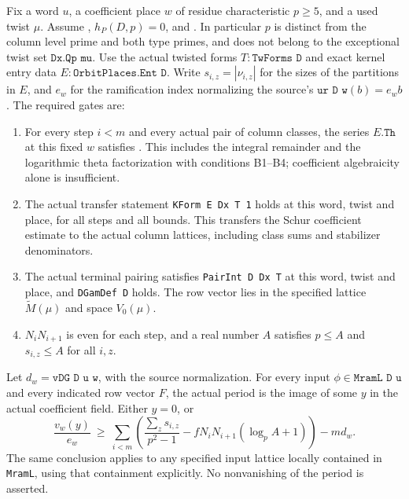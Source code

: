 \documentclass[11pt,a4paper]{article}
\theoremstyle{definition}
\theoremstyle{remark}
\begin{document}
Fix a word $u$, a coefficient place $w$ of residue characteristic
$p\ge5$, and a used twist $\mu$.  Assume
, $h_P(D,p)=0$, and
.  In particular $p$ is distinct from the
column level prime and both type primes, and does not belong to the
exceptional twist set $\texttt{Dx.Qp mu}$.
Use the actual twisted forms $T:\texttt{TwForms D}$ and exact kernel
entry data $E:\texttt{OrbitPlaces.Ent D}$.  Write
$s_{i,z}=|\nu_{i,z}|$ for the sizes of the partitions in $E$, and
$e_w$ for the ramification index normalizing the source's
$\texttt{ur D w}(b)=e_wb$.  The required gates are:
\begin{enumerate}
\item For every step $i<m$ and every actual pair of column classes,
      the series $E.\texttt{Th}$ at this fixed $w$ satisfies
      .  This includes the integral
      remainder and the logarithmic theta factorization with conditions
      B1--B4; coefficient algebraicity alone is insufficient.
\item The actual transfer statement \texttt{KForm E Dx T 1} holds at
      this word, twist and place, for all steps and all bounds.  This
      transfers the Schur coefficient estimate to the actual column
      lattices, including class sums and stabilizer denominators.
\item The actual terminal pairing satisfies \texttt{PairInt D Dx T}
      at this word, twist and place, and \texttt{DGamDef D} holds.
      The row vector lies in the specified lattice
      $\widetilde M(\mu)$ and space $V_0(\mu)$.
\item $N_iN_{i+1}$ is even for each step, and a real number $A$ satisfies
      $p\le A$ and $s_{i,z}\le A$ for all $i,z$.
\end{enumerate}
Let $d_w=\texttt{vDG D u w}$, with the source normalization.
For every input $\phi\in\texttt{MramL D u}$ and every indicated row
vector $F$, the actual period is the image of some $y$ in the actual
coefficient field.  Either $y=0$, or
\begin{equation}\label{eq:SF08-pointwise}
 \frac{v_w(y)}{e_w}\ \ge\
 \sum_{i<m}\left(
   \frac{\sum_z s_{i,z}}{p^2-1}
       -fN_iN_{i+1}(\log_p A+1)\right)-m d_w.
\end{equation}
The same conclusion applies to any specified input lattice locally
contained in \texttt{MramL}, using that containment explicitly.
No nonvanishing of the period is asserted.
\end{document}
